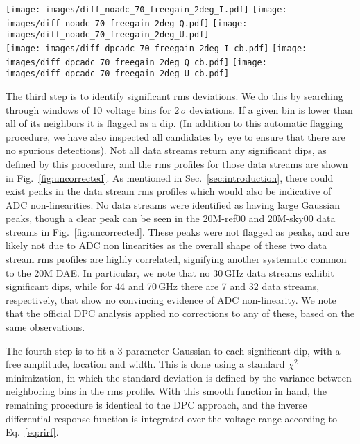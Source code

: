\documentclass[twocolumn]{aa}
\newcommand{\BP}{\textsc{BeyondPlanck}}
\begin{document}
\begin{figure*}[t]
\texttt{[image: images/diff\_noadc\_70\_freegain\_2deg\_I.pdf]}
\texttt{[image: images/diff\_noadc\_70\_freegain\_2deg\_Q.pdf]}
\texttt{[image: images/diff\_noadc\_70\_freegain\_2deg\_U.pdf]}\\
\texttt{[image: images/diff\_dpcadc\_70\_freegain\_2deg\_I\_cb.pdf]}
\texttt{[image: images/diff\_dpcadc\_70\_freegain\_2deg\_Q\_cb.pdf]}
\texttt{[image: images/diff\_dpcadc\_70\_freegain\_2deg\_U\_cb.pdf]}

\caption{Effect of ADC corrections on the 70\,GHz sky maps. (\textit{Top row:}) Difference between the \BP\ ADC corrections the no ADC corrections with gain sampling enabled. (\textit{Bottom row:}) Difference between the \BP\ ADC corrections and the DPC ADC corrections with gain sampling enabled.}

\label{fig:sky_maps_70}
\end{figure*} 
The third step is to identify significant rms deviations. We do this by searching through windows of 10 voltage bins for $2\,\sigma$ deviations. If a given bin is lower than all of its neighbors it is flagged as a dip. (In addition to this automatic flagging procedure, we have also inspected all candidates by eye to ensure that there are no spurious detections). Not all data streams return any significant dips, as defined by this procedure, and the rms profiles for those data streams are shown in Fig.~\ref{fig:uncorrected}. As mentioned in Sec.~\ref{sec:introduction}, there could exist peaks in the data stream rms profiles which would also be indicative of ADC non-linearities. No data streams were identified as having large Gaussian peaks, though a clear peak can be seen in the 20M-ref00 and 20M-sky00 data streams in Fig.~\ref{fig:uncorrected}. These peaks were not flagged as peaks, and are likely not due to ADC non linearities as the overall shape of these two data stream rms profiles are highly correlated, signifying another systematic common to the 20M DAE. In particular, we note that no 30\,GHz data streams exhibit significant dips, while for 44 and 70\,GHz there are 7 and 32 data streams, respectively, that show no convincing evidence of ADC non-linearity. We note that the official DPC analysis applied no corrections to any of these, based on the same observations.

The fourth step is to fit a 3-parameter Gaussian to each significant dip, with a free amplitude, location and width. This is done using a standard $\chi^2$ minimization, in which the standard deviation is defined by the variance between neighboring bins in the rms profile. With this smooth function in hand, the remaining procedure is identical to the DPC approach, and the inverse differential response function is integrated over the voltage range according to Eq.~\eqref{eq:rirf}.
\end{document}
